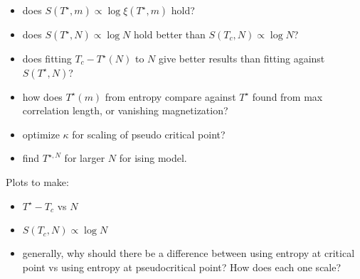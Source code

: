 \begin{itemize}
  \item does $S(T^{\star}, m) \propto \log \xi(T^{\star}, m)$ hold?
  \item does $S(T^{\star}, N) \propto \log N$ hold better than $S(T_c, N) \propto \log N$?
  \item does fitting $T_c - T^{\star}(N)$ to $N$ give better results than fitting against
  $S(T^{\star}, N)$?
  \item how does $T^{\star}(m)$ from entropy compare against $T^{\star}$ found from max correlation length, or
  vanishing magnetization?
  \item optimize $\kappa$ for scaling of pseudo critical point?
  \item find $T^{\star, N}$ for larger $N$ for ising model.

\end{itemize}

Plots to make:

\begin{itemize}
  \item $T^{\star} - T_c$ vs $N$
  \item $S(T_c, N) \propto \log N$
  \item generally, why should there be a difference between using entropy at critical point
  vs using entropy at pseudocritical point? How does each one scale?
\end{itemize}
